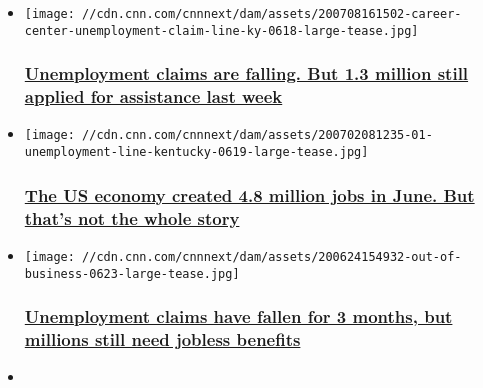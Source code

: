 \begin{itemize}
\item
  \href{/2020/07/09/economy/unemployment-benefits-coronavirus/index.html}{}

  \texttt{[image: //cdn.cnn.com/cnnnext/dam/assets/200708161502-career-center-unemployment-claim-line-ky-0618-large-tease.jpg]}

  \hypertarget{unemployment-claims-are-falling-but-13-million-still-applied-for-assistance-last-week}{%
  \subsubsection{\texorpdfstring{\href{/2020/07/09/economy/unemployment-benefits-coronavirus/index.html}{Unemployment
  claims are falling. But 1.3 million still applied for assistance last
  week}}{Unemployment claims are falling. But 1.3 million still applied for assistance last week}}\label{unemployment-claims-are-falling-but-13-million-still-applied-for-assistance-last-week}}
\item
  \href{/2020/07/02/economy/june-2020-jobs-report-coronavirus/index.html}{}

  \texttt{[image: //cdn.cnn.com/cnnnext/dam/assets/200702081235-01-unemployment-line-kentucky-0619-large-tease.jpg]}

  \hypertarget{the-us-economy-created-48-million-jobs-in-june-but-thats-not-the-whole-story}{%
  \subsubsection{\texorpdfstring{\href{/2020/07/02/economy/june-2020-jobs-report-coronavirus/index.html}{The
  US economy created 4.8 million jobs in June. But that's not the whole
  story}}{The US economy created 4.8 million jobs in June. But that's not the whole story}}\label{the-us-economy-created-48-million-jobs-in-june-but-thats-not-the-whole-story}}
\item
  \href{/2020/06/25/economy/unemployment-benefits-coronavirus/index.html}{}

  \texttt{[image: //cdn.cnn.com/cnnnext/dam/assets/200624154932-out-of-business-0623-large-tease.jpg]}

  \hypertarget{unemployment-claims-have-fallen-for-3-months-but-millions-still-need-jobless-benefits}{%
  \subsubsection{\texorpdfstring{\href{/2020/06/25/economy/unemployment-benefits-coronavirus/index.html}{Unemployment
  claims have fallen for 3 months, but millions still need jobless
  benefits}}{Unemployment claims have fallen for 3 months, but millions still need jobless benefits}}\label{unemployment-claims-have-fallen-for-3-months-but-millions-still-need-jobless-benefits}}
\item
  \href{/2020/06/18/economy/unemployment-benefits-coronavirus/index.html}{}


\end{itemize}
